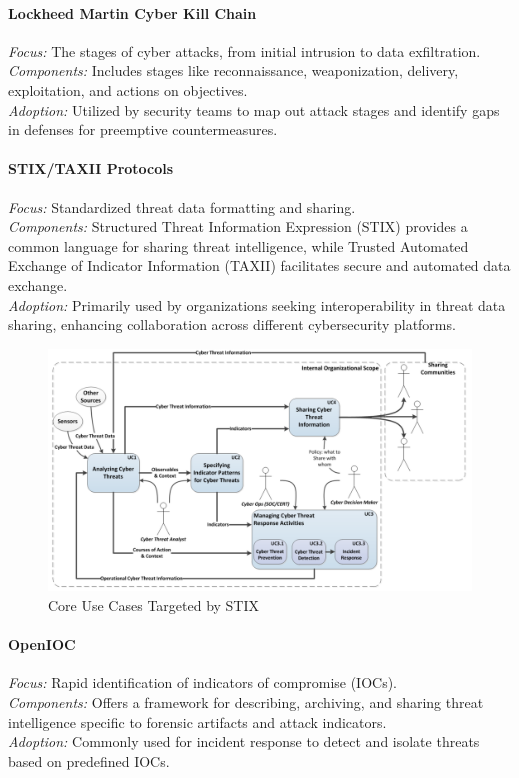 \documentclass[a4paper,twoside,12pt]{report}
\begin{document}
\paragraph{Lockheed Martin Cyber Kill Chain \citet{naik2022comparing}}
\textit{Focus:} The stages of cyber attacks, from initial intrusion to data exfiltration. \\
\textit{Components:} Includes stages like reconnaissance, weaponization, delivery, exploitation, and actions on objectives. \\
\textit{Adoption:} Utilized by security teams to map out attack stages and identify gaps in defenses for preemptive countermeasures.

\paragraph{STIX/TAXII Protocols \citet{provatas2023standards}}
\textit{Focus:} Standardized threat data formatting and sharing. \\
\textit{Components:} Structured Threat Information Expression (STIX) provides a common language for sharing threat intelligence, while Trusted Automated Exchange of Indicator Information (TAXII) facilitates secure and automated data exchange. \\
\textit{Adoption:} Primarily used by organizations seeking interoperability in threat data sharing, enhancing collaboration across different cybersecurity platforms.
\begin{figure}[ht]
    \centering
    \includegraphics[width=1.0\linewidth]{images/stix-system.png}  %
    \caption{\citep{barnum2012standardizing} Core Use Cases Targeted by STIX}
    \label{fig:thing1}
\end{figure}
\paragraph{OpenIOC \citet{janotistrategic}}
\textit{Focus:} Rapid identification of indicators of compromise (IOCs). \\
\textit{Components:} Offers a framework for describing, archiving, and sharing threat intelligence specific to forensic artifacts and attack indicators. \\
\textit{Adoption:} Commonly used for incident response to detect and isolate threats based on predefined IOCs.
\end{document}
